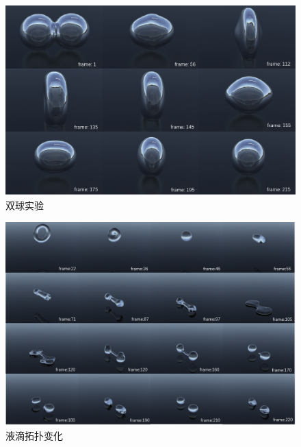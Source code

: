 \begin{figure}[htbp]
    \centering
    \includegraphics[scale=0.56]{./images/DoubleSphere.png}
    \caption[双球实验]{双球实验}
    \label{fig: double sphere experience}
\end{figure}

\begin{figure}[htbp]
    \centering
    \includegraphics[scale=0.56]{./images/TorusSplit.png}
    \caption[液滴拓扑变化实验]{液滴拓扑变化}
    \label{fig: torus split experience}
\end{figure}

